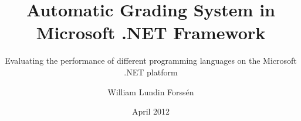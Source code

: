 \title{Automatic Grading System in Microsoft .NET Framework}

\subtitle{Evaluating the performance of different programming languages on the Microsoft .NET platform}


\author{William Lundin Forss\'{e}n}
\date{April 2012}
